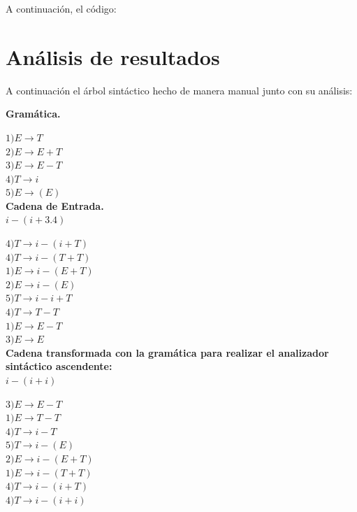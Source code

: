 \documentclass[letterpaper]{article}
\begin{document}
A continuación, el código:



\section{Análisis de resultados}
A continuación el árbol sintáctico hecho de manera manual junto con su análisis:

\textbf{Gramática.}

$1) E \rightarrow T$ \\
$2) E \rightarrow E + T$ \\
$3) E \rightarrow E - T$ \\
$4) T \rightarrow i$ \\
$5) E \rightarrow (E)$ \\

\textbf{Cadena de Entrada.} \\
$i-(i+3.4)$

$4) T \rightarrow i - (i + T)$ \\
$4) T \rightarrow i - (T + T)$ \\
$1) E \rightarrow i - (E + T)$ \\
$2) E \rightarrow i - (E)$ \\
$5) T \rightarrow i - i + T$ \\
$4) T \rightarrow T - T $ \\
$1) E \rightarrow E - T$ \\
$3) E \rightarrow E$ \\

\textbf{Cadena transformada con la gramática para realizar el analizador sintáctico ascendente:} \\
$i-(i +i)$

$3) E \rightarrow E - T$ \\
$1) E \rightarrow T - T$ \\
$4) T \rightarrow i - T$ \\
$5) T \rightarrow i - (E)$ \\
$2) E \rightarrow i - (E + T)$ \\
$1) E \rightarrow i - (T + T)$ \\
$4) T \rightarrow i - (i + T)$ \\
$4) T \rightarrow i - (i + i)$ \\
\end{document}
